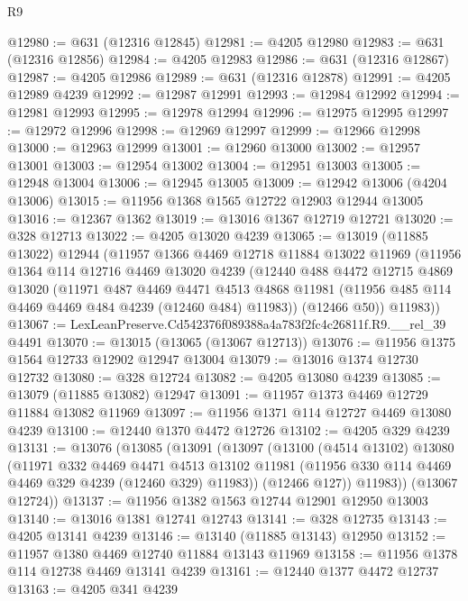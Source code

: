 \begin{lexlean}{R9}
\begin{coremodule}
@12980 := @631 (@12316 @12845)
@12981 := @4205 @12980
@12983 := @631 (@12316 @12856)
@12984 := @4205 @12983
@12986 := @631 (@12316 @12867)
@12987 := @4205 @12986
@12989 := @631 (@12316 @12878)
@12991 := @4205 @12989 @4239
@12992 := @12987 @12991
@12993 := @12984 @12992
@12994 := @12981 @12993
@12995 := @12978 @12994
@12996 := @12975 @12995
@12997 := @12972 @12996
@12998 := @12969 @12997
@12999 := @12966 @12998
@13000 := @12963 @12999
@13001 := @12960 @13000
@13002 := @12957 @13001
@13003 := @12954 @13002
@13004 := @12951 @13003
@13005 := @12948 @13004
@13006 := @12945 @13005
@13009 := @12942 @13006 (@4204 @13006)
@13015 := @11956 @1368 @1565 @12722 @12903 @12944 @13005
@13016 := @12367 @1362
@13019 := @13016 @1367 @12719 @12721
@13020 := @328 @12713
@13022 := @4205 @13020 @4239
@13065 := @13019
    (@11885 @13022)
    @12944
    (@11957
      @1366
      @4469
      @12718
      @11884
      @13022
      @11969
      (@11956
        @1364
        @114
        @12716
        @4469
        @13020
        @4239
        (@12440
          @488
          @4472
          @12715
          @4869
          @13020
          (@11971
            @487
            @4469
            @4471
            @4513
            @4868
            @11981
            (@11956 @485 @114 @4469 @4469 @484 @4239 (@12460 @484) @11983))
          (@12466 @50))
        @11983))
@13067 := LexLeanPreserve.Cd542376f089388a4a783f2fc4c26811f.R9.__rel_39 @4491
@13070 := @13015 (@13065 (@13067 @12713))
@13076 := @11956 @1375 @1564 @12733 @12902 @12947 @13004
@13079 := @13016 @1374 @12730 @12732
@13080 := @328 @12724
@13082 := @4205 @13080 @4239
@13085 := @13079 (@11885 @13082) @12947
@13091 := @11957 @1373 @4469 @12729 @11884 @13082 @11969
@13097 := @11956 @1371 @114 @12727 @4469 @13080 @4239
@13100 := @12440 @1370 @4472 @12726
@13102 := @4205 @329 @4239
@13131 := @13076
    (@13085
      (@13091
        (@13097
          (@13100
            (@4514 @13102)
            @13080
            (@11971
              @332
              @4469
              @4471
              @4513
              @13102
              @11981
              (@11956 @330 @114 @4469 @4469 @329 @4239 (@12460 @329) @11983))
            (@12466 @127))
          @11983))
      (@13067 @12724))
@13137 := @11956 @1382 @1563 @12744 @12901 @12950 @13003
@13140 := @13016 @1381 @12741 @12743
@13141 := @328 @12735
@13143 := @4205 @13141 @4239
@13146 := @13140 (@11885 @13143) @12950
@13152 := @11957 @1380 @4469 @12740 @11884 @13143 @11969
@13158 := @11956 @1378 @114 @12738 @4469 @13141 @4239
@13161 := @12440 @1377 @4472 @12737
@13163 := @4205 @341 @4239

\end{coremodule}
\end{lexlean}
